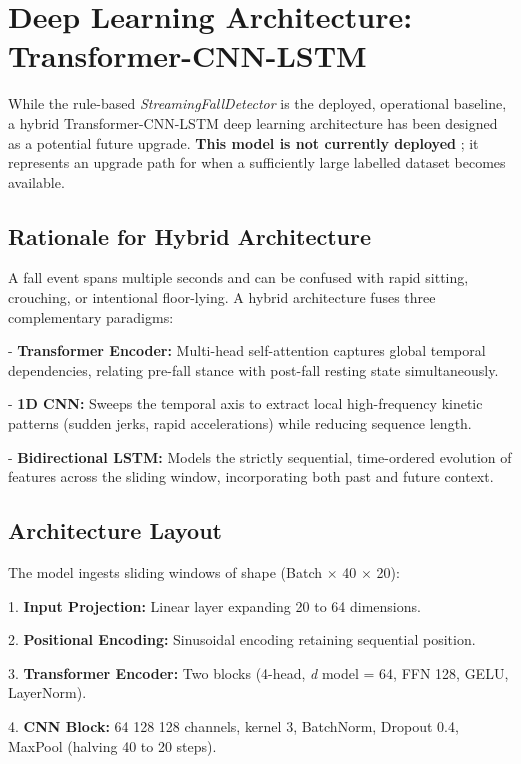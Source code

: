\chapter{Deep Learning Architecture: Transformer-CNN-LSTM}



While the rule-based \textit{StreamingFallDetector} is the deployed, operational baseline, a hybrid Transformer-CNN-LSTM deep learning architecture has been designed as a potential future upgrade. \textbf{This model is not currently deployed} ; it represents an upgrade path for when a sufficiently large labelled dataset becomes available. 

\section{Rationale for Hybrid Architecture}

A fall event spans multiple seconds and can be confused with rapid sitting, crouching, or intentional floor-lying. A hybrid architecture fuses three complementary paradigms: 

- \textbf{Transformer Encoder:} Multi-head self-attention captures global temporal dependencies, relating pre-fall stance with post-fall resting state simultaneously. 

- \textbf{1D CNN:} Sweeps the temporal axis to extract local high-frequency kinetic patterns (sudden jerks, rapid accelerations) while reducing sequence length. 

- \textbf{Bidirectional LSTM:} Models the strictly sequential, time-ordered evolution of features across the sliding window, incorporating both past and future context. 

\section{Architecture Layout}

The model ingests sliding windows of shape (Batch \textit{$\times$} 40 \textit{$\times$} 20): 

1. \textbf{Input Projection:} Linear layer expanding 20 to 64 dimensions. 


2. \textbf{Positional Encoding:} Sinusoidal encoding retaining sequential position. 

3. \textbf{Transformer Encoder:} Two blocks (4-head, \textit{d} model = 64, FFN 128, GELU, LayerNorm). 

4. \textbf{CNN Block:} 64 \textit{ } 128 \textit{ } 128 channels, kernel 3, BatchNorm, Dropout 0.4, MaxPool (halving 40 to 20 steps). 

